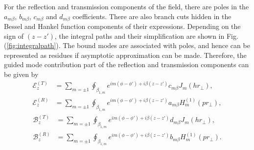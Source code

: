 For the reflection and transmission components of the field, there are poles in the $ a_{m\beta} $, $ b_{m\beta} $, $ c_{m\beta} $ and $ d_{m\beta} $ coefficients. There are also branch cuts hidden in the Bessel and Hankel function components of their expressions. Depending on the sign of $ (z-z') $, the integral paths and their simplification are shown in Fig.(\ref{fig:integralpath}). The bound modes are associated with poles, and hence can be represented as residues if asymptotic approximation can be made. Therefore, the guided mode contribution part of the reflection and transmission components can be given by
\begin{subequations}\label{ET0RRes}
\begin{align}
\mathcal{E}^{(T)}_z &= \sum_{m=\pm 1} \oint_{\beta_{1,m}}  e^{im(\phi\!-\!\phi') + i\beta (z\!-\!z')} c_{m\beta} J_m (hr\!_\perp),\\
\mathcal{E}^{(R)}_z &= \sum_{m=\pm 1} \oint_{\beta_{1,m}} e^{im(\phi\!-\!\phi') + i\beta (z\!-\!z')} a_{m\beta} H_m^{(1)} (pr\!_\perp),
\end{align}
\end{subequations}
\begin{subequations}\label{BT0RRes}
\begin{align}
\mathcal{B}^{(T)}_z &= \sum_{m=\pm 1} \oint_{\beta_{1,m}} e^{im(\phi\!-\!\phi') + i\beta (z\!-\!z')} d_{m\beta} J_m (hr\!_\perp),\\
\mathcal{B}^{(R)}_z &= \sum_{m=\pm 1} \oint_{\beta_{1,m}} e^{im(\phi\!-\!\phi') + i\beta (z\!-\!z')} b_{m\beta} H_m^{(1)} (pr\!_\perp).
\end{align}
\end{subequations}
